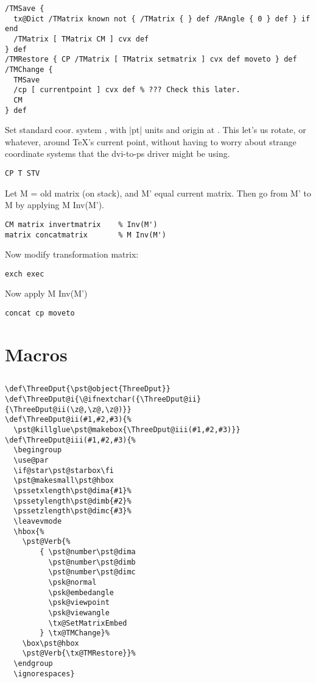 \documentclass[11pt,english,BCOR10mm,DIV12,bibliography=totoc,parskip=false,smallheadings
    headexclude,footexclude,oneside,dvipsnames,svgnames]{pst-doc}
\begin{document}
\begin{lstlisting}
/TMSave {
  tx@Dict /TMatrix known not { /TMatrix { } def /RAngle { 0 } def } if end
  /TMatrix [ TMatrix CM ] cvx def
} def
/TMRestore { CP /TMatrix [ TMatrix setmatrix ] cvx def moveto } def
/TMChange {
  TMSave
  /cp [ currentpoint ] cvx def % ??? Check this later.
  CM
} def
\end{lstlisting}
 Set standard coor. system , with |pt| units and origin at .
 This let's us rotate, or whatever, around \TeX's current point, without
 having to worry about strange coordinate systems that the dvi-to-ps
 driver might be using.
\begin{lstlisting}
CP T STV
\end{lstlisting}

 Let M = old matrix (on stack), and M' equal current matrix. Then
 go from M' to M by applying  M Inv(M').
\begin{lstlisting}
CM matrix invertmatrix    % Inv(M')
matrix concatmatrix       % M Inv(M')
\end{lstlisting}
 Now modify transformation matrix:
\begin{lstlisting}
exch exec
\end{lstlisting}
Now apply M Inv(M')
\begin{lstlisting}
concat cp moveto
\end{lstlisting}


\section{Macros}
\subsection{}

\begin{lstlisting}
\def\ThreeDput{\pst@object{ThreeDput}}
\def\ThreeDput@i{\@ifnextchar({\ThreeDput@ii}{\ThreeDput@ii(\z@,\z@,\z@)}}
\def\ThreeDput@ii(#1,#2,#3){%
  \pst@killglue\pst@makebox{\ThreeDput@iii(#1,#2,#3)}}
\def\ThreeDput@iii(#1,#2,#3){%
  \begingroup
  \use@par
  \if@star\pst@starbox\fi
  \pst@makesmall\pst@hbox
  \pssetxlength\pst@dima{#1}%
  \pssetylength\pst@dimb{#2}%
  \pssetzlength\pst@dimc{#3}%
  \leavevmode
  \hbox{%
    \pst@Verb{%
        { \pst@number\pst@dima
          \pst@number\pst@dimb
          \pst@number\pst@dimc
          \psk@normal
          \psk@embedangle
          \psk@viewpoint
          \psk@viewangle
          \tx@SetMatrixEmbed
        } \tx@TMChange}%
    \box\pst@hbox
    \pst@Verb{\tx@TMRestore}}%
  \endgroup
  \ignorespaces}
\end{lstlisting}
\end{document}

